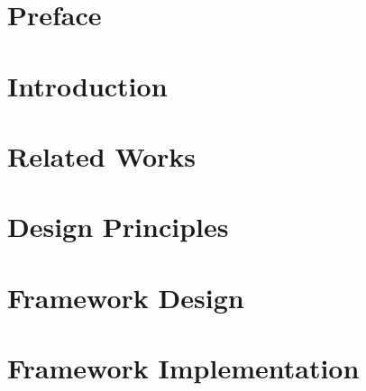





\chapter*{Preface}



\tableofcontents

\chapter{Introduction}






\chapter{Related Works}









\chapter{Design Principles}



\chapter{Framework Design} \label{cha:design}





\chapter{Framework Implementation} \label{cha:frameworkImplementation}











